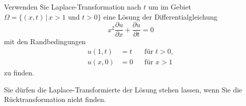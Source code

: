 Verwenden Sie Laplace-Transformation nach $t$ um
im Gebiet $\Omega=\{(x,t)\,|\, x > 1 \text{ und } t > 0\}$ eine
Lösung der Differentialgleichung
\begin{equation}
x^2\frac{\partial u}{\partial x}+\frac{\partial u}{\partial t}=0
\label{50000011:dgl}
\end{equation}
mit den Randbedingungen
\begin{equation}
\begin{aligned}
u(1,t)&=t& &\text{für $t>0$},\\
u(x,0)&=0& &\text{für $x > 1$}
\end{aligned}
\label{50000011:rb}
\end{equation}
zu finden.

\begin{hinweis}
Sie dürfen die Laplace-Transformierte der Lösung stehen lassen, wenn Sie
die Rücktransformation nicht finden.
\end{hinweis}

